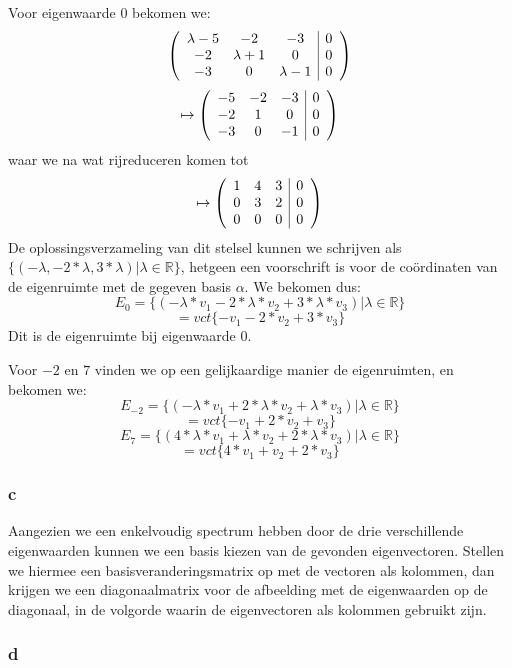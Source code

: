 \documentclass[lineaire_algebra_oplossingen.tex]{subfiles}
\begin{document}
Voor eigenwaarde 0 bekomen we:
\[\left(
\begin{array}{c c c | c}
\lambda-5 & -2 & -3 & 0\\
-2 & \lambda+1 & 0 & 0\\
-3 & 0 & \lambda-1 & 0\\
\end{array}
\right)\]
\[\mapsto\left(
\begin{array}{c c c | c}
-5 & -2 & -3 & 0 \\
-2 & 1 & 0 & 0\\
-3 & 0 & -1 & 0\\
\end{array}
\right)\]
waar we na wat rijreduceren komen tot
\[\mapsto\left(
\begin{array}{c c c | c}
1 & 4 & 3 & 0 \\
0 & 3 & 2 & 0\\
0 & 0 & 0 & 0\\
\end{array}
\right)\]
De oplossingsverzameling van dit stelsel kunnen we schrijven als $\{(-\lambda,-2*\lambda,3*\lambda)|\lambda\in\mathbb{R}\}$, hetgeen een voorschrift is voor de co\"ordinaten van de eigenruimte met de gegeven basis $\alpha$. We bekomen dus:
\[E_0 = \{(-\lambda*v_1-2*\lambda*v_2+3*\lambda*v_3)|\lambda\in\mathbb{R}\}\]
\[=vct\{-v_1-2*v_2+3*v_3\}\]
Dit is de eigenruimte bij eigenwaarde 0.

Voor $-2$ en $7$ vinden we op een gelijkaardige manier de eigenruimten, en bekomen we:
\[E_{-2} = \{(-\lambda*v_1+2*\lambda*v_2+\lambda*v_3)|\lambda\in\mathbb{R}\}\]
\[=vct\{-v_1+2*v_2+v_3\}\]
\[E_{7} = \{(4*\lambda*v_1+\lambda*v_2+2*\lambda*v_3)|\lambda\in\mathbb{R}\}\]
\[=vct\{4*v_1+v_2+2*v_3\}\]

\subsubsection*{c}

Aangezien we een enkelvoudig spectrum hebben door de drie verschillende eigenwaarden kunnen we een basis kiezen van de gevonden eigenvectoren. Stellen we hiermee een basisveranderingsmatrix op met de vectoren als kolommen, dan krijgen we een diagonaalmatrix voor de afbeelding met de eigenwaarden op de diagonaal, in de volgorde waarin de eigenvectoren als kolommen gebruikt zijn.

\subsubsection*{d}
\end{document}
